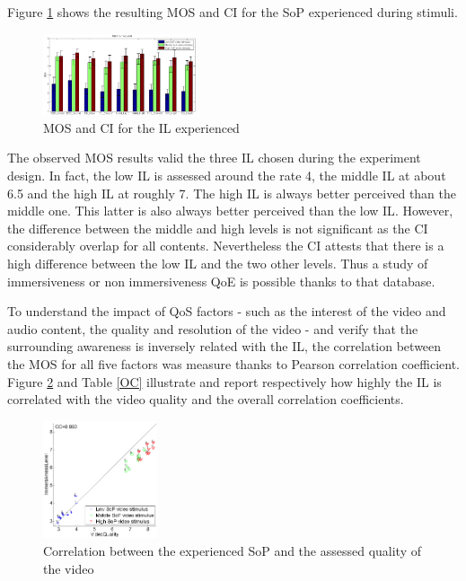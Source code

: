 \indent Figure \ref{MOS} shows the resulting \ac{MOS} and \ac{CI} for the \ac{SoP} experienced during stimuli.
\begin{figure}[!ht]
    \center
    \includegraphics[width=0.4\textwidth]{./images/MOS_ImmersivnessLevel.png}
    \caption{\ac{MOS} and \ac{CI} for the \ac{IL} experienced}
    \label{MOS}
\end{figure}

The observed \ac{MOS} results valid the three \ac{IL} chosen during the experiment design. In fact, the low \ac{IL} is assessed around the rate 4, the middle \ac{IL} at about 6.5 and the high \ac{IL} at roughly 7. The high \ac{IL} is always better perceived than the middle one. This latter is also always better perceived than the low \ac{IL}.
However, the difference between the middle and high levels is not significant as the \ac{CI} considerably overlap for all contents.
Nevertheless the \ac{CI} attests that there is a high difference between the low \ac{IL} and the two other levels. Thus a study of immersiveness or non immersiveness \ac{QoE} is possible thanks to that database.

\indent To understand the impact of \ac{QoS} factors - such as the interest of the video and audio content, the quality and resolution of the video - and verify that the surrounding awareness is inversely related with the \ac{IL}, the correlation between the \ac{MOS} for all five factors was measure thanks to Pearson correlation coefficient. Figure \ref{Correlation} and Table \ref{OC} illustrate and report respectively how highly the \ac{IL} is correlated with the video quality and the overall correlation coefficients.

\begin{figure}[!ht]
    \center
    \includegraphics[width=0.3\textwidth]{./images/VA_IL_C.png}
    \caption{Correlation between the experienced \ac{SoP} and the assessed quality of the video }
    \label{Correlation}
\end{figure}


